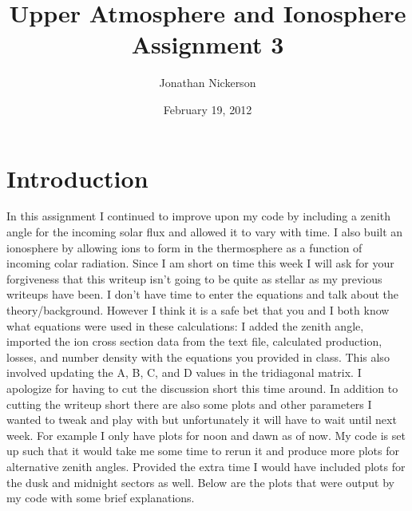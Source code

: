 \documentclass[10pt]{article}
\begin{document}
\title{Upper Atmosphere and Ionosphere Assignment 3}
\author{Jonathan Nickerson}
\date{February 19, 2012}
\maketitle

\section{Introduction}
In this assignment I continued to improve upon my code by including a zenith angle for the incoming solar flux and allowed it to vary with time. I also built an ionosphere by allowing ions to form in the thermosphere as a function of incoming colar radiation. Since I am short on time this week I will ask for your forgiveness that this writeup isn't going to be quite as stellar as my previous writeups have been. I don't have time to enter the equations and talk about the theory/background. However I think it is a safe bet that you and I both know what equations were used in these calculations: I added the zenith angle, imported the ion cross section data from the text file, calculated production, losses, and number density with the equations you provided in class. This also involved updating the A, B, C, and D values in the tridiagonal matrix. I apologize for having to cut the discussion short this time around. In addition to cutting the writeup short there are also some plots and other parameters I wanted to tweak and play with but unfortunately it will have to wait until next week. For example I only have plots for noon and dawn as of now. My code is set up such that it would take me some time to rerun it and produce more plots for alternative zenith angles. Provided the extra time I would have included plots for the dusk and midnight sectors as well. Below are the plots that were output by my code with some brief explanations.
\end{document}
